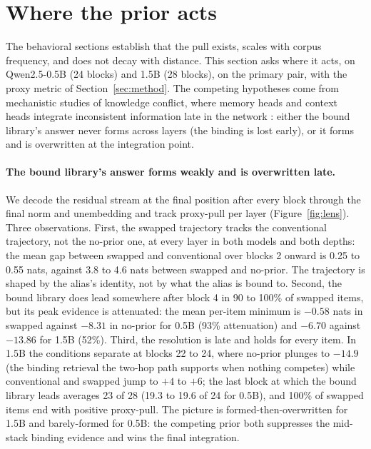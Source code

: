 \documentclass[11pt]{article}
\begin{document}
\section{Where the prior acts}
\label{sec:mech}

The behavioral sections establish that the pull exists, scales with corpus frequency, and does not decay with distance. This section asks where it acts, on Qwen2.5-0.5B (24 blocks) and 1.5B (28 blocks), on the primary pair, with the proxy metric of Section~\ref{sec:method}. The competing hypotheses come from mechanistic studies of knowledge conflict, where memory heads and context heads integrate inconsistent information late in the network \citep{yu2023characterizing,jin2024cutting,ortu2024competition}: either the bound library's answer never forms across layers (the binding is lost early), or it forms and is overwritten at the integration point.

\paragraph{The bound library's answer forms weakly and is overwritten late.} We decode the residual stream at the final position after every block through the final norm and unembedding \citep{nostalgebraist2020interpreting,geva2022transformer} and track proxy-pull per layer (Figure~\ref{fig:lens}). Three observations. First, the swapped trajectory tracks the conventional trajectory, not the no-prior one, at every layer in both models and both depths: the mean gap between swapped and conventional over blocks 2 onward is 0.25 to 0.55 nats, against 3.8 to 4.6 nats between swapped and no-prior. The trajectory is shaped by the alias's identity, not by what the alias is bound to. Second, the bound library does lead somewhere after block 4 in 90 to 100\% of swapped items, but its peak evidence is attenuated: the mean per-item minimum is $-0.58$ nats in swapped against $-8.31$ in no-prior for 0.5B (93\% attenuation) and $-6.70$ against $-13.86$ for 1.5B (52\%). Third, the resolution is late and holds for every item. In 1.5B the conditions separate at blocks 22 to 24, where no-prior plunges to $-14.9$ (the binding retrieval the two-hop path supports when nothing competes) while conventional and swapped jump to $+4$ to $+6$; the last block at which the bound library leads averages 23 of 28 (19.3 to 19.6 of 24 for 0.5B), and 100\% of swapped items end with positive proxy-pull. The picture is formed-then-overwritten for 1.5B and barely-formed for 0.5B: the competing prior both suppresses the mid-stack binding evidence and wins the final integration.
\end{document}
